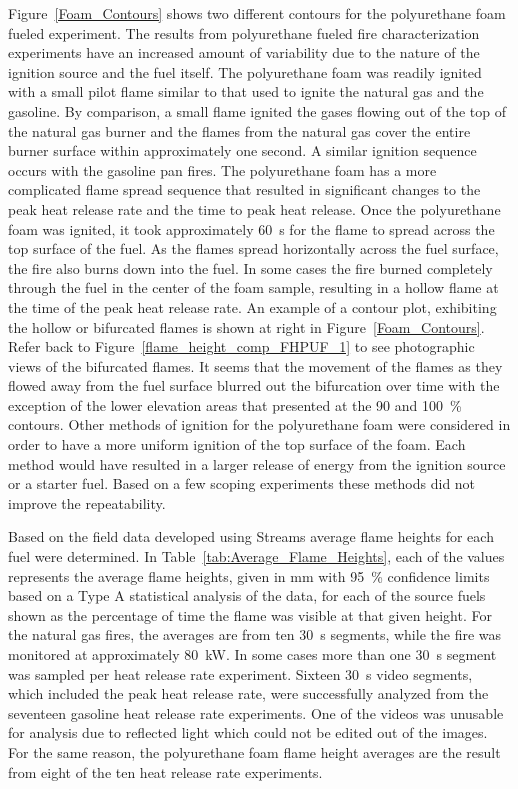 \documentclass[twoside]{uocthesis}
\begin{document}
{Figure~\ref{Foam_Contours} shows two different contours for the polyurethane foam fueled experiment.  The results from polyurethane fueled fire characterization experiments have an increased amount of variability due to the nature of the ignition source and the fuel itself.  The polyurethane foam was readily ignited with a small pilot flame similar to that used to ignite the natural gas and the gasoline.  By comparison, a small flame ignited the gases flowing out of the top of the natural gas burner and the flames from the natural gas cover the entire burner surface within approximately one second.  A similar ignition sequence occurs with the gasoline pan fires. The polyurethane foam has a more complicated flame spread sequence that resulted in significant changes to the peak heat release rate and the time to peak heat release.  Once the polyurethane foam was ignited, it took approximately 60~s for the flame to spread across the top surface of the fuel.  As the flames spread horizontally across the fuel surface, the fire also burns down into the fuel.  In some cases the fire burned completely through the fuel in the center of the foam sample, resulting in a hollow flame at the time of the peak heat release rate.  An example of a contour plot, exhibiting the hollow or bifurcated flames is shown at right in Figure~\ref{Foam_Contours}. Refer back to Figure~\ref{flame_height_comp_FHPUF_1} to see photographic views of the bifurcated flames.  It seems that the movement of the flames as they flowed away from the fuel surface blurred out the bifurcation over time with the exception of the lower elevation areas that presented at the 90 and 100~\% contours.  Other methods of ignition for the polyurethane foam were considered in order to have a more uniform ignition of the top surface of the foam.  Each method would have resulted in a larger release of energy from the ignition source or a starter fuel.   Based on a few scoping experiments these methods did not improve the repeatability.

Based on the field data developed using Streams average flame heights for each fuel were determined.  In Table~\ref{tab:Average_Flame_Heights}, each of the values represents the average flame heights, given in mm with 95~\% confidence limits based on a Type A statistical analysis of the data, for each of the source fuels shown as the percentage of time the flame was visible at that given height.  For the natural gas fires, the averages are from ten 30~s segments, while the fire was monitored at approximately 80~kW.  In some cases more than one 30~s segment was sampled per heat release rate experiment.  Sixteen 30~s video segments, which included the peak heat release rate, were successfully analyzed from the seventeen gasoline heat release rate experiments.  One of the videos was unusable for analysis due to reflected light which could not be edited out of the images.  For the same reason, the polyurethane foam flame height averages are the result from eight of the ten heat release rate experiments.

}
\end{document}
